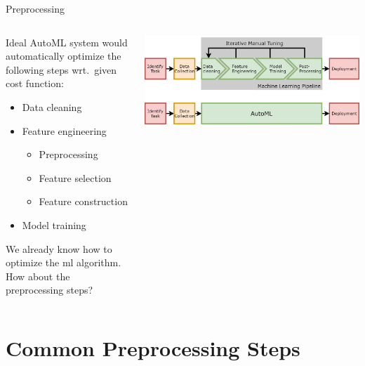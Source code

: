 \begin{frame}{Preprocessing}
  \begin{columns}
    \begin{column}{0.5\textwidth} 
      Ideal AutoML system would automatically optimize the following steps wrt.\ given cost function:
      \begin{itemize}
        \item[\ding{55}] Data cleaning
        \item[\ding{55}] Feature engineering
        \begin{itemize}
          \item Preprocessing
          \item Feature selection
          \item Feature construction  
        \end{itemize}
        \item[\ding{51}] Model training
      \end{itemize}
    We already know how to optimize the ml algorithm. How about the preprocessing steps?
    \end{column}%
    \begin{column}{0.5\textwidth}
      \begin{center}
        \includegraphics[width = \linewidth]{images/AutoMLPipeline.jpg}  
      \end{center}
    \end{column}
  \end{columns}
  
\end{frame}

\section{Common Preprocessing Steps}

